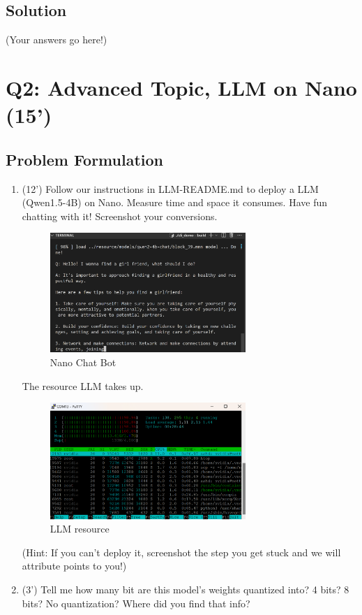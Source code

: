\documentclass[12pt,a4paper]{article}
\theoremstyle{definition}
\begin{document}
\subsection{Solution}
(Your answers go here!)




\section{Q2: Advanced Topic, LLM on Nano (15')}
\subsection{Problem Formulation}
\begin{enumerate}
    \item (12') Follow our instructions in LLM-README.md to deploy a LLM (Qwen1.5-4B) on Nano. Measure time and space it consumes. Have fun chatting with it! Screenshot your conversions.
    
    \begin{figure}[H]
        \centering
        \includegraphics[width=0.7\textwidth]{qwen-llm.jpg}
        \caption{Nano Chat Bot}
        \label{fig:enter-label}
    \end{figure}
    
    The resource LLM takes up.
    
    \begin{figure}[H]
        \centering
        \includegraphics[width=0.7\textwidth]{llm-resource.jpg}
        \caption{LLM resource}
        \label{fig:enter-label}
    \end{figure}
    
    (Hint: If you can't deploy it, screenshot the step you get stuck and we will attribute points to you!)

    \item (3') Tell me how many bit are this model's weights quantized into? 4 bits? 8 bits? No quantization? Where did you find that info?
    
\end{enumerate}
\end{document}
